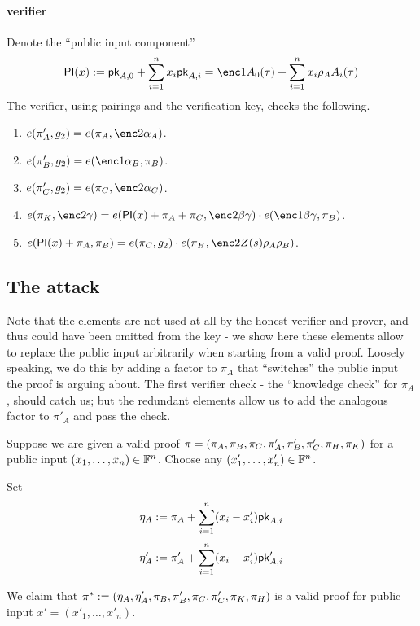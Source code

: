 \documentclass[11pt]{article}
\numberwithin{equation}{section} %
\numberwithin{figure}{section} %
\begin{document}
\paragraph{\bctv verifier\\}
Denote the ``public input component'' 
\[ \PI(x) \defeq \pk_{A,0} + \sum_{i=1}^n x_i \pk_{A,i} = \enc1{A_0(\tau) + \sum_{i=1}^n x_i \rho_A A_i(\tau) }\]
 The verifier, using pairings and the verification key, checks the following.
\begin{enumerate}
 \item $e(\pi'_A,g_2)=e(\pi_A,\enc2{\alpha_A})$.
\item $e(\pi'_B, g_2)=e(\enc1{\alpha_B},\pi_B)$.
\item $e(\pi'_C,g_2)=e(\pi_C,\enc2{\alpha_C})$.
\item $e(\pi_K,\enc2{\gamma})=e(\PI(x)+\pi_A+\pi_C,\enc2{\beta\gamma})\cdot e(\enc1{\beta\gamma},\pi_B)$.
\item $e(\PI(x)+\pi_A,\pi_B)= e(\pi_C,g_2)\cdot e(\pi_H,\enc2{Z(s)\rho_A\rho_B})$.
 \end{enumerate}
 
 \subsection{The attack}\label{subsec:attack}
 Note that the elements  are not used at all by the honest verifier and prover, and thus could have been omitted from the key - we show here these elements allow to replace the public input arbitrarily when starting from a valid proof.
 Loosely speaking, we do this by adding a factor to $\pi_A$ that ``switches'' the public input the proof is arguing about.
 The first verifier check - the ``knowledge check'' for $\pi_A$, should catch us; but the redundant elements allow us to add
 the analogous factor to $\pi'_A$ and pass the check.
 
 
 Suppose we are given a valid proof $\pi = (\pi_A,\pi_B,\pi_C,\pi'_A,\pi'_B,\pi'_C,\pi_H,\pi_K)$
 for a public input $(x_1,\ldots,x_n)\in \mathbb F^{n}$.
 Choose any $(x'_1,\ldots,x'_n)\in \mathbb F^n$.

 Set 
 \[\eta_A:= \pi_A + \sum_{i=1}^n (x_i-x'_i)\mathsf{pk}_{A,i}\]
 \[\eta'_A:= \pi'_A + \sum_{i=1}^n (x_i-x'_i) \mathsf{pk}'_{A,i}\]
 
 We claim that $\pi^* := (\eta_A,\eta'_A,\pi_B,\pi'_B,\pi_C,\pi'_C,\pi_K,\pi_H)$ is a valid proof for
 public input $x'=(x'_1,\ldots,x'_n)$.
 
\end{document}
